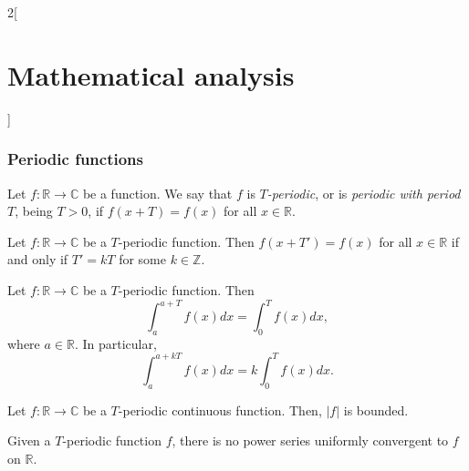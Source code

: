 \documentclass[class=article,crop=false]{standalone}
\begin{document}
\begin{multicols}{2}[\section{Mathematical analysis}]
\subsubsection*{Periodic functions}
\begin{definition}
Let $f:\mathbb{R}\rightarrow\mathbb{C}$ be a function. We say that $f$ is \textit{$T$-periodic}, or is \textit{periodic with period $T$}, being $T>0$, if $f(x+T)=f(x)$ for all $x\in\mathbb{R}$.
\end{definition}
\begin{lemma}
Let $f:\mathbb{R}\rightarrow\mathbb{C}$ be a $T$-periodic function. Then $f(x+T')=f(x)$ for all $x\in\mathbb{R}$ if and only if $T'=kT$ for some $k\in\mathbb{Z}$.
\end{lemma}
\begin{prop}
Let $f:\mathbb{R}\rightarrow\mathbb{C}$ be a $T$-periodic function. Then $$\int_a^{a+T}f(x)dx=\int_0^Tf(x)dx,$$ where $a\in\mathbb{R}$. In particular, $$\int_a^{a+kT}f(x)dx=k\int_0^Tf(x)dx.$$
\end{prop}
\begin{lemma}
Let $f:\mathbb{R}\rightarrow\mathbb{C}$ be a $T$-periodic continuous function. Then, $|f|$ is bounded.
\end{lemma}
\begin{prop}
Given a $T$-periodic function $f$, there is no power series uniformly convergent to $f$ on $\mathbb{R}$.
\end{prop}

\end{multicols}
\end{document}
